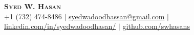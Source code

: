 \begin{center}
	\textbf{\Huge \scshape Syed W. Hasan} \\ \vspace{3.5pt}
    \small{+1 (732) 474-8486} $|$
    \href{mailto:syedwadoodhassan@gmail.com}{\underline{syedwadoodhassan@gmail.com}} $|$
    \href{https://www.linkedin.com/in/syedwadoodhasan/}{\underline{linkedin.com/in/syedwadoodhasan/}} $|$
    \href{https://github.com/swhasans}{\underline{github.com/swhasans}}
\end{center}